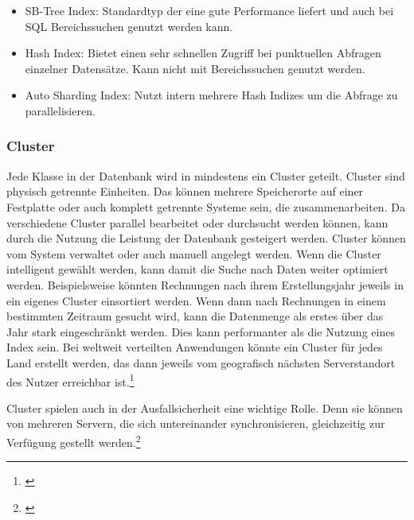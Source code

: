 \begin{itemize}
    \item SB-Tree Index: Standardtyp der eine gute Performance liefert und auch bei \gls{SQL} Bereichssuchen genutzt werden kann.
    \item Hash Index: Bietet einen sehr schnellen Zugriff bei punktuellen Abfragen einzelner Datensätze. Kann nicht mit Bereichssuchen genutzt werden.
    \item Auto Sharding Index: Nutzt intern mehrere Hash Indizes um die Abfrage zu parallelisieren.
\end{itemize}


\subsubsection{Cluster}


Jede Klasse in der Datenbank wird in mindestens ein Cluster geteilt. Cluster sind physisch getrennte Einheiten. Das können mehrere Speicherorte auf einer Festplatte oder auch komplett getrennte Systeme sein, die zusammenarbeiten. Da verschiedene Cluster parallel bearbeitet oder durchsucht werden können, kann durch die Nutzung die Leistung der Datenbank gesteigert werden. Cluster können vom System verwaltet oder auch manuell angelegt werden. Wenn die Cluster intelligent gewählt werden, kann damit die Suche nach Daten weiter optimiert werden. Beispielsweise könnten Rechnungen nach ihrem Erstellungsjahr jeweils in ein eigenes Cluster einsortiert werden. Wenn dann nach Rechnungen in einem bestimmten Zeitraum gesucht wird, kann die Datenmenge als erstes über das Jahr stark eingeschränkt werden. Dies kann performanter als die Nutzung eines Index sein. Bei weltweit verteilten Anwendungen könnte ein Cluster für jedes Land erstellt werden, das dann jeweils vom geografisch nächsten Serverstandort des Nutzer erreichbar ist.\footnote{\cite[Vgl.][]{OrientDBClusters}}

Cluster spielen auch in der Ausfallsicherheit eine wichtige Rolle. Denn sie können von mehreren Servern, die sich untereinander synchronisieren, gleichzeitig zur Verfügung gestellt werden.\footnote{\cite[Vgl.][]{OrientDBDistributedArchitecture}}

